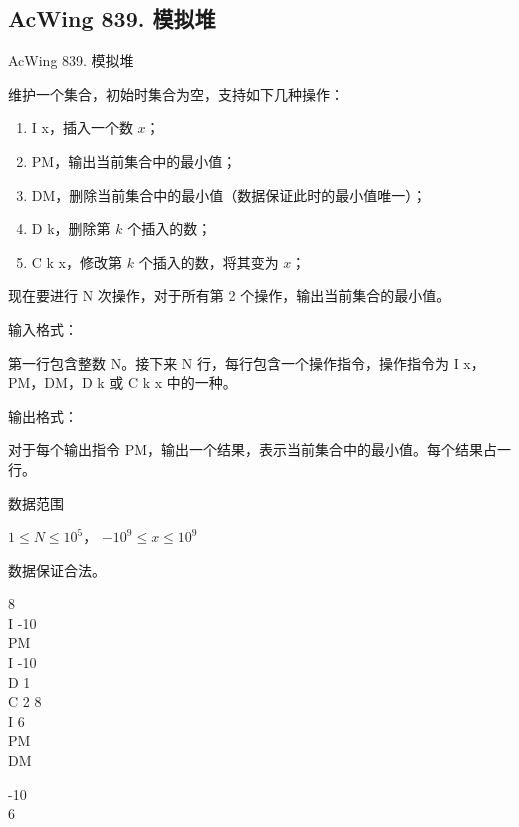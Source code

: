\subsection{AcWing 839. 模拟堆}

\begin{titledbox}{AcWing 839. 模拟堆}

维护一个集合，初始时集合为空，支持如下几种操作：

\begin{enumerate}
    \itemsep=-5pt
    \item I x，插入一个数 $x$；
    \item PM，输出当前集合中的最小值；
    \item DM，删除当前集合中的最小值（数据保证此时的最小值唯一）；
    \item D k，删除第 $k$ 个插入的数；
    \item C k x，修改第 $k$ 个插入的数，将其变为 $x$；
\end{enumerate}

现在要进行 N 次操作，对于所有第 2 个操作，输出当前集合的最小值。

输入格式：

第一行包含整数 N。接下来 N 行，每行包含一个操作指令，操作指令为 I x，PM，DM，D k 或 C k x 中的一种。

输出格式：

对于每个输出指令 PM，输出一个结果，表示当前集合中的最小值。每个结果占一行。

数据范围

$1 \le N \le 10^5$， $−10^9 \le x \le 10^9$

数据保证合法。

\begin{inputblock}
    8 \\
    I -10 \\
    PM \\
    I -10 \\
    D 1 \\
    C 2 8 \\
    I 6 \\
    PM \\
    DM
\end{inputblock}
\begin{outputblock}
    -10 \\
    6
\end{outputblock}
\end{titledbox}

